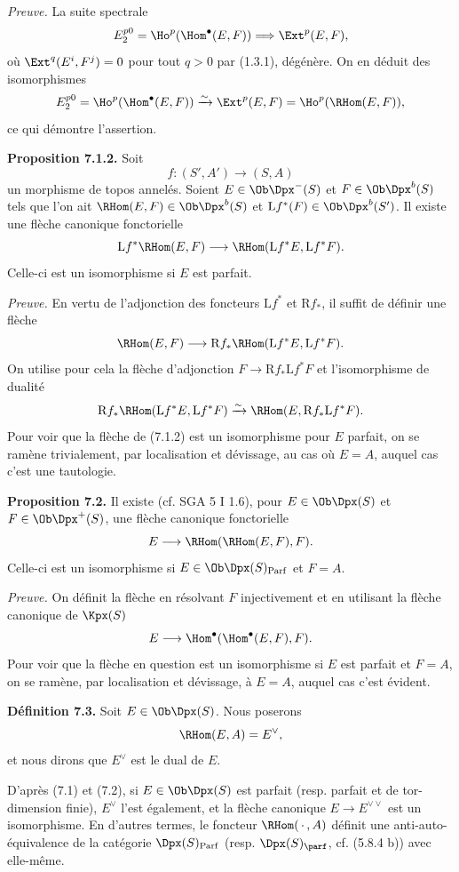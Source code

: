 \documentclass[11pt]{article}
\newcommand{\Parf}{\operatorname{Parf}}
\begin{document}
\emph{Preuve.} La suite spectrale
\[
  E_2^{p0}=\Ho^p(\Hom^\bullet(E,F))
  \Longrightarrow \Ext^p(E,F),
\]
où \(\Ext^q(E^i,F^j)=0\) pour tout \(q>0\) par (1.3.1), dégénère. On en déduit des isomorphismes
\[
  E_2^{p0}=\Ho^p(\Hom^\bullet(E,F))
  \xrightarrow{\sim}\Ext^p(E,F)=\Ho^p(\RHom(E,F)),
\]
ce qui démontre l'assertion.

\textbf{Proposition 7.1.2.} Soit
\[
  f:(S',A')\longrightarrow(S,A)
\]
un morphisme de topos annelés. Soient \(E\in\Ob\Dpx^-(S)\) et \(F\in\Ob\Dpx^b(S)\) tels que l'on ait \(\RHom(E,F)\in\Ob\Dpx^b(S)\) et \(\mathrm Lf^*(F)\in\Ob\Dpx^b(S')\). Il existe une flèche canonique fonctorielle
\[
  \mathrm Lf^*\RHom(E,F)
  \longrightarrow
  \RHom(\mathrm Lf^*E,\mathrm Lf^*F).
\]
Celle-ci est un isomorphisme si \(E\) est parfait.

\emph{Preuve.} En vertu de l'adjonction des foncteurs \(\mathrm Lf^*\) et \(\mathrm Rf_*\), il suffit de définir une flèche
\[
  \RHom(E,F)
  \longrightarrow
  \mathrm Rf_*\RHom(\mathrm Lf^*E,\mathrm Lf^*F).
\]
On utilise pour cela la flèche d'adjonction \(F\to\mathrm Rf_*\mathrm Lf^*F\) et l'isomorphisme de dualité
\[
  \mathrm Rf_*\RHom(\mathrm Lf^*E,\mathrm Lf^*F)
  \xrightarrow{\sim}
  \RHom(E,\mathrm Rf_*\mathrm Lf^*F).
\]
Pour voir que la flèche de (7.1.2) est un isomorphisme pour \(E\) parfait, on se ramène trivialement, par localisation et dévissage, au cas où \(E=A\), auquel cas c'est une tautologie.

\textbf{Proposition 7.2.} Il existe (cf. SGA 5 I 1.6), pour \(E\in\Ob\Dpx(S)\) et \(F\in\Ob\Dpx^+(S)\), une flèche canonique fonctorielle
\[
  E\longrightarrow\RHom(\RHom(E,F),F).
\]
Celle-ci est un isomorphisme si \(E\in\Ob\Dpx(S)_{\Parf}\) et \(F=A\).

\emph{Preuve.} On définit la flèche en résolvant \(F\) injectivement et en utilisant la flèche canonique de \(\Kpx(S)\)
\[
  E\longrightarrow\Hom^\bullet(\Hom^\bullet(E,F),F).
\]
Pour voir que la flèche en question est un isomorphisme si \(E\) est parfait et \(F=A\), on se ramène, par localisation et dévissage, à \(E=A\), auquel cas c'est évident.

\textbf{Définition 7.3.} Soit \(E\in\Ob\Dpx(S)\). Nous poserons
\[
  \RHom(E,A)=E^\vee,
\]
et nous dirons que \(E^\vee\) est le dual de \(E\).

D'après (7.1) et (7.2), si \(E\in\Ob\Dpx(S)\) est parfait (resp. parfait et de tor-dimension finie), \(E^\vee\) l'est également, et la flèche canonique \(E\to E^{\vee\vee}\) est un isomorphisme. En d'autres termes, le foncteur \(\RHom(\,\cdot\,,A)\) définit une anti-auto-équivalence de la catégorie \(\Dpx(S)_{\Parf}\) (resp. \(\Dpx(S)_{\parf}\), cf. (5.8.4 b)) avec elle-même.
\end{document}

